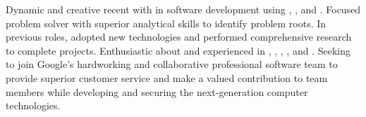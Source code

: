 

\begin{cvparagraph}

Dynamic and creative recent  with  in software development using , ,  and . Focused problem solver with superior analytical skills to identify problem roots. In previous roles, adopted new technologies and performed comprehensive research to complete projects. Enthusiastic about and experienced in , , , ,  and . Seeking to join Google's hardworking and collaborative professional software team to provide superior customer service and make a valued contribution to team members  while developing and securing the next-generation computer technologies.
\end{cvparagraph}
